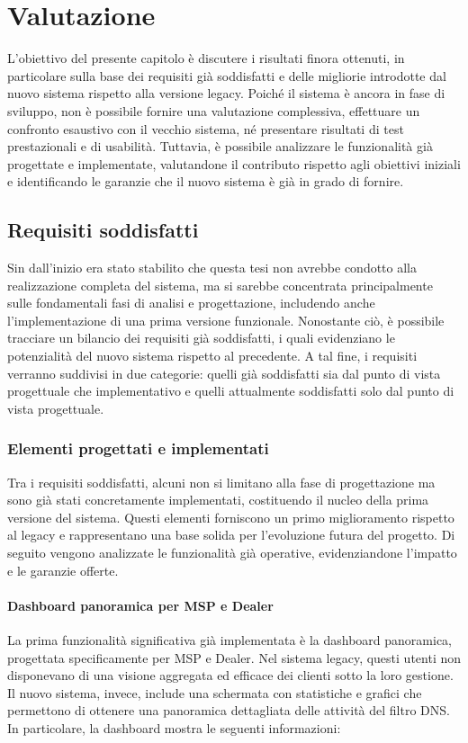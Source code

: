 \chapter{Valutazione}

L'obiettivo del presente capitolo è discutere i risultati finora ottenuti, in particolare sulla base dei requisiti già soddisfatti e delle migliorie introdotte dal nuovo sistema rispetto alla versione legacy. Poiché il sistema è ancora in fase di sviluppo, non è possibile fornire una valutazione complessiva, effettuare un confronto esaustivo con il vecchio sistema, né presentare risultati di test prestazionali e di usabilità. Tuttavia, è possibile analizzare le funzionalità già progettate e implementate, valutandone il contributo rispetto agli obiettivi iniziali e identificando le garanzie che il nuovo sistema è già in grado di fornire.

\section{Requisiti soddisfatti}
Sin dall'inizio era stato stabilito che questa tesi non avrebbe condotto alla realizzazione completa del sistema, ma si sarebbe concentrata principalmente sulle fondamentali fasi di analisi e progettazione, includendo anche l'implementazione di una prima versione funzionale. Nonostante ciò, è possibile tracciare un bilancio dei requisiti già soddisfatti, i quali evidenziano le potenzialità del nuovo sistema rispetto al precedente. A tal fine, i requisiti verranno suddivisi in due categorie: quelli già soddisfatti sia dal punto di vista progettuale che implementativo e quelli attualmente soddisfatti solo dal punto di vista progettuale.

\subsection{Elementi progettati e implementati}
Tra i requisiti soddisfatti, alcuni non si limitano alla fase di progettazione ma sono già stati concretamente implementati, costituendo il nucleo della prima versione del sistema. Questi elementi forniscono un primo miglioramento rispetto al legacy e rappresentano una base solida per l’evoluzione futura del progetto. Di seguito vengono analizzate le funzionalità già operative, evidenziandone l'impatto e le garanzie offerte.

\subsubsection{Dashboard panoramica per MSP e Dealer}
La prima funzionalità significativa già implementata è la dashboard panoramica, progettata specificamente per MSP e Dealer. Nel sistema legacy, questi utenti non disponevano di una visione aggregata ed efficace dei clienti sotto la loro gestione. Il nuovo sistema, invece, include una schermata con statistiche e grafici che permettono di ottenere una panoramica dettagliata delle attività del filtro DNS. In particolare, la dashboard mostra le seguenti informazioni:

